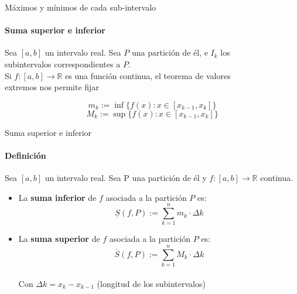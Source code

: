 \documentclass{plantillaPPT}
\begin{document}
\begin{frame}{Máximos y mínimos de cada sub-intervalo}
    \framesubtitle{Suma superior e inferior}

\begin{definicion}
    Sea \([a,b]\) un intervalo real. Sea \(P\) una partición de él, e \(I_k\) los \\ \vspace{0.1cm} subintervalos correspondientes a \(P\). \\ \vspace{0.15cm} Si \(f : [a,b] \to \mathbb{R}\) es una función continua, el teorema de valores \\ \vspace{0.1cm}extremos nos permite fijar

    \[m_k := \inf\{f(x):x\in[x_{k-1},x_k]\}\]
    \[M_k := \sup\{f(x):x\in[x_{k-1}, x_k]\}\]
\end{definicion}
    
\end{frame}

\begin{frame}{Suma superior e inferior}
    \framesubtitle{Definición}

    \begin{definicion}
        Sea \([a,b]\) un intervalo real. Sea P una partición de él y \(f : [a,b] \to \mathbb{R}\) continua.
        \begin{itemize}
            \item La \textbf{suma inferior} de \(f\) asociada a la partición \(P\) es:
            \[\underline{S}(f,P) := \sum_{k=1}^n m_k \cdot \Delta k\]
            \item La \textbf{suma superior} de \(f\) asociada a la partición \(P\) es:
            \[\overline{S}(f,P) := \sum_{k=1}^n M_k \cdot \Delta k\] \\ \vspace{0.25cm}
            Con \(\Delta k = x_k - x_{k-1}\) (longitud de los subintervalos)
        \end{itemize}
    \end{definicion}
    
\end{frame}
\end{document}
